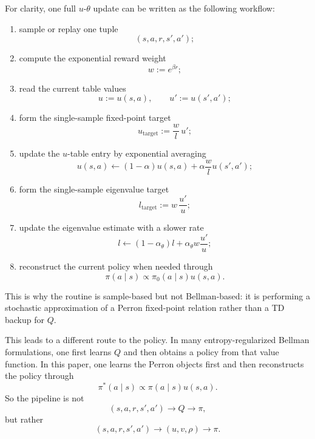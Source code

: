 \documentclass[11pt]{article}
\begin{document}
For clarity, one full \(u\)-\(\theta\) update can be written as the following workflow:
\begin{enumerate}
    \item sample or replay one tuple
    \begin{equation}
        (s,a,r,s',a');
    \end{equation}
    \item compute the exponential reward weight
    \begin{equation}
        w:=e^{\beta r};
    \end{equation}
    \item read the current table values
    \begin{equation}
        u:=u(s,a),
        \qquad
        u':=u(s',a');
    \end{equation}
    \item form the single-sample fixed-point target
    \begin{equation}
        u_{\mathrm{target}}
        :=
        \frac{w}{l}\,u';
    \end{equation}
    \item update the \(u\)-table entry by exponential averaging
    \begin{equation}
        u(s,a)
        \leftarrow
        (1-\alpha)u(s,a)+\alpha \frac{w}{l}u(s',a');
    \end{equation}
    \item form the single-sample eigenvalue target
    \begin{equation}
        l_{\mathrm{target}}
        :=
        w\,\frac{u'}{u};
    \end{equation}
    \item update the eigenvalue estimate with a slower rate
    \begin{equation}
        l
        \leftarrow
        (1-\alpha_\theta)l+\alpha_\theta w\frac{u'}{u};
    \end{equation}
    \item reconstruct the current policy when needed through
    \begin{equation}
        \pi(a\mid s)\propto \pi_0(a\mid s)u(s,a).
    \end{equation}
\end{enumerate}
This is why the routine is sample-based but not Bellman-based: it is performing a stochastic
approximation of a Perron fixed-point relation rather than a TD backup for \(Q\).

This leads to a different route to the policy. In many entropy-regularized Bellman formulations,
one first learns \(Q\) and then obtains a policy from that value function. In this paper, one
learns the Perron objects first and then reconstructs the policy through
\begin{equation}
    \pi^*(a\mid s)\propto \pi(a\mid s)u(s,a).
\end{equation}
So the pipeline is not
\begin{equation}
    (s,a,r,s',a') \to Q \to \pi,
\end{equation}
but rather
\begin{equation}
    (s,a,r,s',a') \to (u,v,\rho) \to \pi.
\end{equation}
\end{document}

